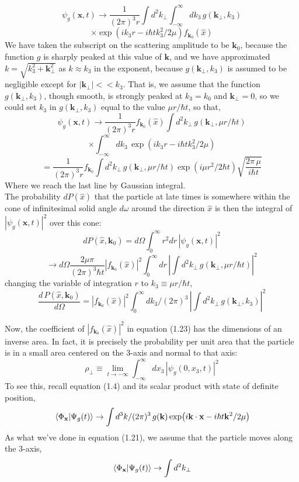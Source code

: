 \documentclass[12pt]{article}
\numberwithin{equation}{section}
\begin{document}
\[\psi_{g}(\mathbf{x}, t)\rightarrow\frac{1}{(2\pi)^3r}\int{d^2k_{\perp}}\int_{-\infty}^{\infty}{dk_3\,g(\mathbf{k}_{\perp}, k_3)}\]
\begin{equation}
    \times\exp(ik_3r-i\hbar tk_3^2/2\mu)f_{\mathbf{k}_0}(\hat{x})
\end{equation}
We have taken the subscript on the scattering amplitude to be $\mathbf{k}_{0}$, because the function $g$ is sharply peaked at this value of $\mathbf{k}$, and we have approximated $k = \sqrt{k_3^2+\mathbf{k}_{\perp}^2}$ as $k\approx k_3$ in the exponent, because $g(\mathbf{k}_{\perp}, k_3)$ is assumed to be negligible except for $|\mathbf{k}_{\perp}|<<k_3$.
That is, we assume that the function $g(\mathbf{k}_{\perp}, k_3)$, though smooth, is strongly peaked at $k_3=k_0$ and $\mathbf{k}_{\perp} = 0$, so we could set $k_3$ in $g(\mathbf{k}_{\perp}, k_3)$ equal to the value $\mu r/\hbar t$, so that,
\[
    \psi_{g}(\mathbf{x}, t)\rightarrow\frac{1}{(2\pi)^3r}f_{\mathbf{k}_0}(\hat{x})\int{d^2k_{\perp}\,g(\mathbf{k}_{\perp}, \mu r/\hbar t)}
\]
\[\times\int_{-\infty}^{\infty}{dk_3\,\exp(ik_3r-i\hbar tk_3^2/2\mu)}\]
\begin{equation}
    =\frac{1}{(2\pi)^3r}f_{\mathbf{k}_0}\int{d^2k_{\perp}\,g(\mathbf{k}_{\perp}, \mu r/\hbar t)\exp(i\mu r^2/2\hbar t)\sqrt{\frac{2\pi\,\mu}{i\hbar t}}}
\end{equation}
Where we reach the last line by Gaussian integral.
\\\indent The probability $dP(\hat{x})$ that the particle at late times is somewhere within the cone of infinitesimal solid angle $d\omega$ around the direction $\hat{x}$ is then the integral of $|\psi_{g}(\mathbf{x}, t)|^2$ over this cone:
\begin{equation}
    dP(\hat{x}, \mathbf{k}_0) = d\Omega\int_{0}^{\infty}{r^2dr\,|\psi_{g}(\mathbf{x}, t)|^2}
\end{equation}
\[\rightarrow d\Omega\frac{2\mu\pi}{(2\pi)^3\hbar t}|f_{\mathbf{k}_0}(\hat{x})|^2\int_{0}^{\infty}{dr\,\left|\int{d^2k_{\perp}\,g(\mathbf{k}_{\perp}, \mu r/\hbar t)}\right|^2}\]
changing the variable of integration $r$ to $k_3\equiv\mu r/\hbar t$,
\begin{equation}
    \frac{d\,P(\hat{x}, \mathbf{k}_0)}{d\Omega} = |f_{\mathbf{k}_0}(\hat{x})|^2\int_{0}^{\infty}{dk_3/(2\pi)^3\,\left|\int{d^2k_{\perp}\,g(\mathbf{k}_{\perp}, k_3)}\right|^2}
\end{equation}

Now, the coefficient of $|f_{\mathbf{k}_0}(\hat{x})|^2$ in equation (1.23) has the dimensions of an inverse area. In fact, it is precisely the probability per unit area that the particle is in a small area centered on the 3-axis and normal to that axis:
\begin{equation}
    \rho_{\perp}\equiv\lim_{t\rightarrow-\infty}\int_{-\infty}^{\infty}{dx_{3}\,\left|\psi_{g}(0, x_3, t)\right|^2}
\end{equation}
To see this, recall equation (1.4) and its scalar product with state of definite position,
\[\braket*{\Phi_{\mathbf{x}}}{\Psi_{g}(t)}\rightarrow\int{d^3k/(2\pi)^3\,g(\mathbf{k})\exp(i\mathbf{k}\cdot\mathbf{x}-i\hbar t\mathbf{k}^2/2\mu)}\]
As what we've done in equation (1.21), we assume that the particle moves along the 3-axis,
\[\braket*{\Phi_{\mathbf{x}}}{\Psi_{g}(t)}\rightarrow\int{d^2k_{\perp}}\]
\end{document}
